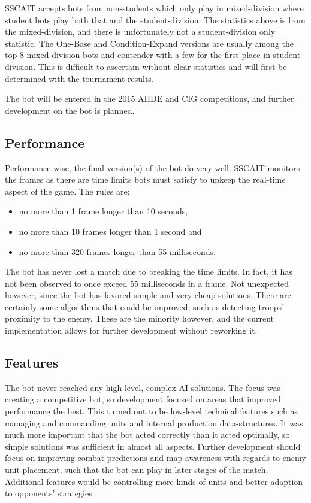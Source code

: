 SSCAIT accepts bots from non-students which only play in mixed-division where student bots play both that and the student-division. The statistics above is from the mixed-division, and there is unfortunately not a student-division only statistic. The One-Base and Condition-Expand versions are usually among the top 8 mixed-division bots and contender with a few for the first place in student-division. This is difficult to ascertain without clear statistics and will first be determined with the tournament results.

The bot will be entered in the 2015 AIIDE and CIG competitions, and further development on the bot is planned.

	\subsection*{Performance}
	Performance wise, the final version(s) of the bot do very well. SSCAIT monitors the frames as there are time limits bots must satisfy to upkeep the real-time aspect of the game. The rules are:
	\begin{itemize}
		\item no more than 1 frame longer than 10 seconds,
		\item no more than 10 frames longer than 1 second and
		\item no more than 320 frames longer than 55 milliseconds.
	\end{itemize}
	The bot has never lost a match due to breaking the time limits. In fact, it has not been observed to once exceed 55 milliseconds in a frame. Not unexpected however, since the bot has favored simple and very cheap solutions. There are certainly some algorithms that could be improved, such as detecting troops' proximity to the enemy. These are the minority however, and the current implementation allows for further development without reworking it.

	\subsection*{Features}
	The bot never reached any high-level, complex AI solutions. The focus was creating a competitive bot, so development focused on areas that improved performance the best. This turned out to be low-level technical features such as managing and commanding units and internal production data-structures. It was much more important that the bot acted correctly than it acted optimally, so simple solutions was sufficient in almost all aspects. Further development should focus on improving combat predictions and map awareness with regards to enemy unit placement, such that the bot can play in later stages of the match. Additional features would be controlling more kinds of units and better adaption to opponents' strategies.
	
